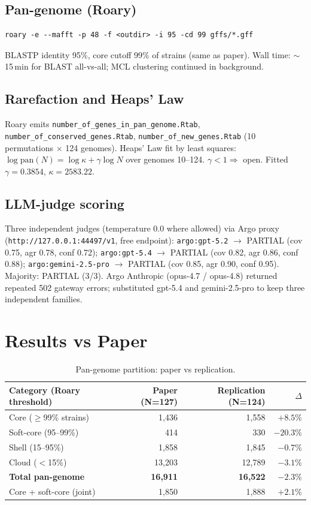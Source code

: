 \documentclass[11pt,letterpaper]{article}
\begin{document}
\subsection{Pan-genome (Roary)}
\begin{lstlisting}[basicstyle=\ttfamily\small,frame=single]
roary -e --mafft -p 48 -f <outdir> -i 95 -cd 99 gffs/*.gff
\end{lstlisting}
BLASTP identity 95\%, core cutoff 99\% of strains (same as paper).
Wall time: $\sim$15\,min for BLAST all-vs-all; MCL clustering continued in background.

\subsection{Rarefaction and Heaps' Law}
Roary emits \texttt{number\_of\_genes\_in\_pan\_genome.Rtab},
\texttt{number\_of\_conserved\_genes.Rtab},
\texttt{number\_of\_new\_genes.Rtab} (10 permutations $\times$ 124 genomes).
Heaps' Law fit by least squares: $\log \text{pan}(N) = \log \kappa + \gamma \log N$
over genomes 10--124. $\gamma < 1 \Rightarrow$ open.
Fitted $\gamma = 0.3854$, $\kappa = 2583.22$.

\subsection{LLM-judge scoring}
Three independent judges (temperature 0.0 where allowed) via Argo proxy
(\texttt{http://127.0.0.1:44497/v1}, free endpoint):
\texttt{argo:gpt-5.2} $\to$ PARTIAL (cov 0.75, agr 0.78, conf 0.72);
\texttt{argo:gpt-5.4} $\to$ PARTIAL (cov 0.82, agr 0.86, conf 0.88);
\texttt{argo:gemini-2.5-pro} $\to$ PARTIAL (cov 0.85, agr 0.90, conf 0.95).
Majority: PARTIAL (3/3). Argo Anthropic (opus-4.7 / opus-4.8) returned repeated 502 gateway errors;
substituted gpt-5.4 and gemini-2.5-pro to keep three independent families.

\section{Results vs Paper}

\begin{table}[h]
\centering
\begin{tabular}{lrrr}
\toprule
Category (Roary threshold) & Paper (N=127) & Replication (N=124) & $\Delta$ \\
\midrule
Core ($\geq$99\% strains)   & 1{,}436  & 1{,}558 & $+8.5\%$ \\
Soft-core (95--99\%)        & 414      & 330     & $-20.3\%$ \\
Shell (15--95\%)            & 1{,}858  & 1{,}845 & $-0.7\%$ \\
Cloud ($<$15\%)             & 13{,}203 & 12{,}789 & $-3.1\%$ \\
\midrule
\textbf{Total pan-genome}   & \textbf{16{,}911} & \textbf{16{,}522} & \textbf{$-2.3\%$} \\
Core + soft-core (joint)    & 1{,}850  & 1{,}888 & $+2.1\%$ \\
\bottomrule
\end{tabular}
\caption{Pan-genome partition: paper vs replication.}
\end{table}
\end{document}
